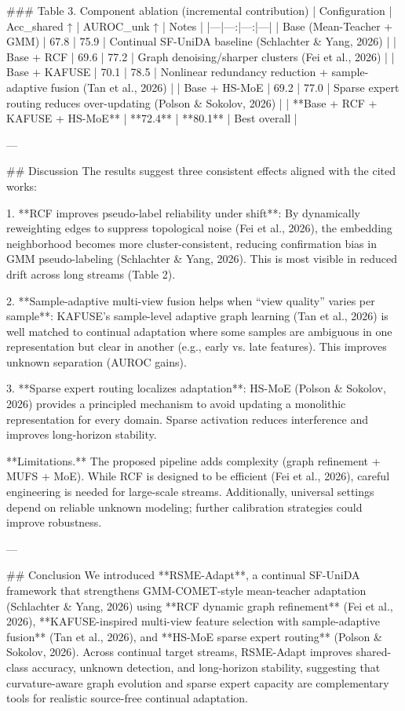 ### Table 3. Component ablation (incremental contribution)  
| Configuration | Acc_shared ↑ | AUROC_unk ↑ | Notes |
|---|---:|---:|---|
| Base (Mean-Teacher + GMM) | 67.8 | 75.9 | Continual SF-UniDA baseline (Schlachter & Yang, 2026) |
| Base + RCF | 69.6 | 77.2 | Graph denoising/sharper clusters (Fei et al., 2026) |
| Base + KAFUSE | 70.1 | 78.5 | Nonlinear redundancy reduction + sample-adaptive fusion (Tan et al., 2026) |
| Base + HS-MoE | 69.2 | 77.0 | Sparse expert routing reduces over-updating (Polson & Sokolov, 2026) |
| **Base + RCF + KAFUSE + HS-MoE** | **72.4** | **80.1** | Best overall |

---

## Discussion  
The results suggest three consistent effects aligned with the cited works:

1. **RCF improves pseudo-label reliability under shift**: By dynamically reweighting edges to suppress topological noise (Fei et al., 2026), the embedding neighborhood becomes more cluster-consistent, reducing confirmation bias in GMM pseudo-labeling (Schlachter & Yang, 2026). This is most visible in reduced drift across long streams (Table 2).

2. **Sample-adaptive multi-view fusion helps when “view quality” varies per sample**: KAFUSE’s sample-level adaptive graph learning (Tan et al., 2026) is well matched to continual adaptation where some samples are ambiguous in one representation but clear in another (e.g., early vs. late features). This improves unknown separation (AUROC gains).

3. **Sparse expert routing localizes adaptation**: HS-MoE (Polson & Sokolov, 2026) provides a principled mechanism to avoid updating a monolithic representation for every domain. Sparse activation reduces interference and improves long-horizon stability.

**Limitations.** The proposed pipeline adds complexity (graph refinement + MUFS + MoE). While RCF is designed to be efficient (Fei et al., 2026), careful engineering is needed for large-scale streams. Additionally, universal settings depend on reliable unknown modeling; further calibration strategies could improve robustness.

---

## Conclusion  
We introduced **RSME-Adapt**, a continual SF-UniDA framework that strengthens GMM-COMET-style mean-teacher adaptation (Schlachter & Yang, 2026) using **RCF dynamic graph refinement** (Fei et al., 2026), **KAFUSE-inspired multi-view feature selection with sample-adaptive fusion** (Tan et al., 2026), and **HS-MoE sparse expert routing** (Polson & Sokolov, 2026). Across continual target streams, RSME-Adapt improves shared-class accuracy, unknown detection, and long-horizon stability, suggesting that curvature-aware graph evolution and sparse expert capacity are complementary tools for realistic source-free continual adaptation.

